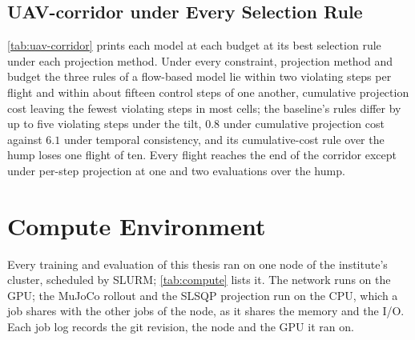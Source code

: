 \FloatBarrier

\section{UAV-corridor under Every Selection Rule}\label{app:uav-corridor-rules}

\autoref{tab:uav-corridor} prints each model at each budget at its best selection rule under each
projection method. Under every constraint, projection method and budget the three rules of a
flow-based model lie within two violating steps per flight and within about fifteen control steps of
one another, cumulative projection cost leaving the fewest violating steps in most cells; the
baseline's rules differ by up to five violating steps under the tilt, $0.8$ under cumulative projection
cost against $6.1$ under temporal consistency, and its cumulative-cost rule over the hump loses one
flight of ten. Every flight reaches the end of the corridor except under per-step projection at one and
two evaluations over the hump.
\ifappendixfull

\else
\label{tab:app:uav-corridor-tilt-ps}\label{tab:app:uav-corridor-tilt-ep}\label{tab:app:uav-corridor-hump-ps}\label{tab:app:uav-corridor-hump-ep}
\fi

\FloatBarrier



\chapter{Compute Environment}\label{app:repro}\label{app:compute}

Every training and evaluation of this thesis ran on one node of the institute's cluster, scheduled by
SLURM; \autoref{tab:compute} lists it. The network runs on the GPU; the MuJoCo rollout and the SLSQP
projection run on the CPU, which a job shares with the other jobs of the node, as it shares the memory
and the I/O. Each job log records the git revision, the node and the GPU it ran on.

